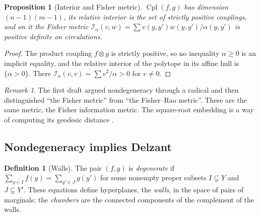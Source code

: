 \documentclass[11pt]{article}
\newtheorem{proposition}[theorem]{Proposition}
\theoremstyle{definition}
\newtheorem{definition}[theorem]{Definition}
\theoremstyle{remark}
\newtheorem{remark}[theorem]{Remark}
\newcommand{\Cpl}{\operatorname{Cpl}}
\begin{document}
\begin{proposition}[Interior and Fisher metric]\label{prop:interior}
$\Cpl(f,g)$ has dimension $(n-1)(m-1)$, its relative interior is the set of strictly positive
couplings, and on it the Fisher metric $\mathcal{I}_\alpha(v,w)=\sum v(y,y')w(y,y')/\alpha(y,y')$ is
positive definite on circulations.
\end{proposition}
\begin{proof}
The product coupling $f\otimes g$ is strictly positive, so no inequality $\alpha\ge0$ is an implicit
equality, and the relative interior of the polytope in its affine hull is $\{\alpha>0\}$. There
$\mathcal{I}_\alpha(v,v)=\sum v^2/\alpha>0$ for $v\ne0$.
\end{proof}

\begin{remark}
The first draft argued nondegeneracy through a radical and then distinguished ``the Fisher metric''
from ``the Fisher--Rao metric''. These are the same metric, the Fisher information metric. The
square-root embedding is a way of computing its geodesic distance \cite[Prop.~8.1]{Awasthi-Attribution}.
\end{remark}

\subsection{Nondegeneracy implies Delzant}

\begin{definition}[Walls]\label{def:walls}
The pair $(f,g)$ is \emph{degenerate} if $\sum_{y\in I}f(y)=\sum_{y'\in J}g(y')$ for some
nonempty proper subsets $I\subsetneq Y$ and $J\subsetneq Y'$. These equations define hyperplanes,
the \emph{walls}, in the space of pairs of marginals; the \emph{chambers} are the connected components of
the complement of the walls.
\end{definition}
\end{document}
